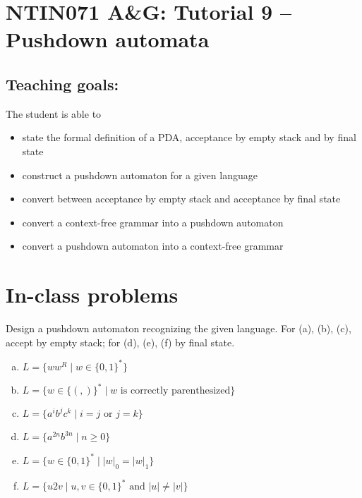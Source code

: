 \documentclass[a4paper,12pt]{amsart}
\begin{document}
\thispagestyle{empty}

\section*{NTIN071 A\&G: Tutorial 9 -- Pushdown automata}

\medskip

\subsection*{Teaching goals:} The student is able to

    \begin{itemize}\setlength{\itemsep}{0pt}
        \item state the formal definition of a PDA, acceptance by empty stack and by final state
        \item construct a pushdown automaton for a given language
        \item convert between acceptance by empty stack and acceptance by final state
        \item convert a context-free grammar into a pushdown automaton
        \item convert a pushdown automaton into a context-free grammar
    \end{itemize}


\section*{In-class problems}


\medskip\begin{problem}\label{problem:construct-pda}

    Design a pushdown automaton recognizing the given language. For (a), (b), (c), accept by empty stack; for (d), (e), (f) by final state.

    \medskip

    \begin{enumerate}[(a)]\setlength\itemsep{3pt}
        \item $L=\{ww^R\mid w\in \{0,1\}^*\}$
        \item $L=\{w\in\{(,)\}^*\mid w\text{ is correctly parenthesized}\}$
        \item $L=\{a^ib^jc^k\mid i=j \text{ or } j=k\} $
        \item $L=\{a^{2n}b^{3n}\mid n\geq 0\}$
        \item $L=\{w\in \{0,1\}^*\mid  |w|_0=|w|_1\} $
        \item $L=\{u2v\mid u,v\in \{0,1\}^*\text{ and }|u|\neq |v|\} $
    \end{enumerate}

\end{problem}
\end{document}
